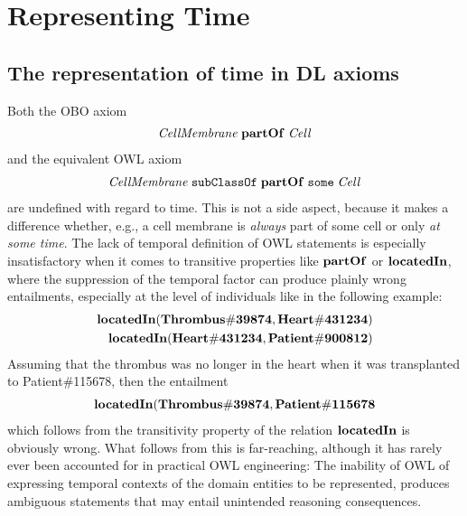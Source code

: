 \section*{Representing Time}

\subsection*{The representation of time in DL axioms}

Both the OBO axiom
%
\begin{equation}
\begin{split}
\mathit{CellMembrane}\;\mathrm{\mathbf{partOf}}\;\mathit{Cell}
\end{split}
\label{eq:cellobo}
\end{equation}  
%
and the equivalent OWL axiom
%
\begin{equation}
\begin{split}
\mathit{CellMembrane}\;\mathtt{subClassOf}\;\mathrm{\mathbf{partOf}}\;\mathtt{some}\;\mathit{Cell}
\end{split}
\label{eq:celldl}
\end{equation}  
%
are undefined with regard to time. This is not a side aspect, because it makes a
difference whether, e.g., a cell membrane is \emph{always} part of some cell or
only \emph{at some time}.
The lack of temporal definition of OWL statements is especially insatisfactory
when it comes to transitive properties like $\mathrm{\mathbf{partOf}}$ or $\mathrm{\mathbf{locatedIn}}$,
where the suppression of the temporal factor can produce plainly wrong entailments,
especially at the level of individuals like in the following example:
%
\begin{equation}
\begin{split}
\mathrm{\mathbf{locatedIn}} (\mathrm{\mathbf{Thrombus\#39874}}, \mathrm{\mathbf{Heart\#431234}})  \\
\mathrm{\mathbf{locatedIn}} (\mathrm{\mathbf{Heart\#431234}}, \mathrm{\mathbf{Patient\#900812}})
\end{split}
\label{eq:trans}
\end{equation}
%
Assuming that the thrombus was no longer in the heart when it was transplanted to Patient\#115678, then the entailment
%
\begin{equation}
\begin{split}
\mathrm{\mathbf{locatedIn}} (\mathrm{\mathbf{Thrombus\#39874}}, \mathrm{\mathbf{Patient\#115678}}
\end{split}
\label{eq:transEntailment}
\end{equation}
%
which follows from the transitivity property of the relation $\mathrm{\mathbf{locatedIn}}$ is obviously wrong.
What follows from this is far-reaching, although it has rarely ever been accounted for in practical OWL engineering:
The inability of OWL of expressing temporal contexts of the domain
entities to be represented, produces ambiguous statements that may entail unintended reasoning consequences.

